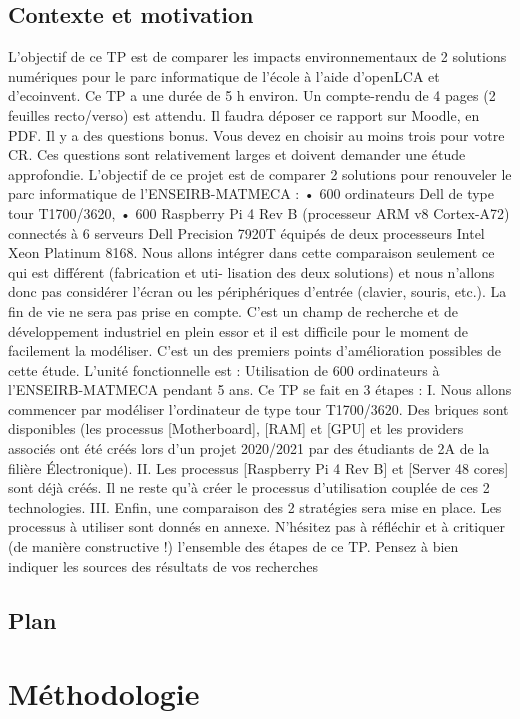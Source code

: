 \documentclass[12pt,a4paper]{article}
\begin{document}
\subsection{Contexte et motivation}
L’objectif de ce TP est de comparer les impacts environnementaux de 2 solutions numériques
pour le parc informatique de l’école à l’aide d’openLCA et d’ecoinvent.
Ce TP a une durée de 5 h environ. Un compte-rendu de 4 pages (2 feuilles
recto/verso) est attendu. Il faudra déposer ce rapport sur Moodle, en PDF.
Il y a des questions bonus. Vous devez en choisir au moins trois pour votre CR. Ces questions
sont relativement larges et doivent demander une étude approfondie.
L’objectif de ce projet est de comparer 2 solutions pour renouveler le parc informatique de
l’ENSEIRB-MATMECA :
• 600 ordinateurs Dell de type tour T1700/3620,
• 600 Raspberry Pi 4 Rev B (processeur ARM v8 Cortex-A72) connectés à 6 serveurs Dell
Precision 7920T équipés de deux processeurs Intel Xeon Platinum 8168.
Nous allons intégrer dans cette comparaison seulement ce qui est différent (fabrication et uti-
lisation des deux solutions) et nous n’allons donc pas considérer l’écran ou les périphériques
d’entrée (clavier, souris, etc.). La fin de vie ne sera pas prise en compte. C’est un champ de
recherche et de développement industriel en plein essor et il est difficile pour le moment de
facilement la modéliser. C’est un des premiers points d’amélioration possibles de cette étude.
L’unité fonctionnelle est :
Utilisation de 600 ordinateurs à l’ENSEIRB-MATMECA pendant 5 ans.
Ce TP se fait en 3 étapes :
I. Nous allons commencer par modéliser l’ordinateur de type tour T1700/3620. Des briques
sont disponibles (les processus [Motherboard], [RAM] et [GPU] et les providers associés
ont été créés lors d’un projet 2020/2021 par des étudiants de 2A de la filière Électronique).
II. Les processus [Raspberry Pi 4 Rev B] et [Server 48 cores] sont déjà créés. Il ne reste qu’à
créer le processus d’utilisation couplée de ces 2 technologies.
III. Enfin, une comparaison des 2 stratégies sera mise en place.
Les processus à utiliser sont donnés en annexe. N’hésitez pas à réfléchir et à
critiquer (de manière constructive !) l’ensemble des étapes de ce TP. Pensez à bien
indiquer les sources des résultats de vos recherches
\subsection{Plan}
\noindent \lipsum[1-2]

\section{Méthodologie}
\lipsum[1-2]
\end{document}
